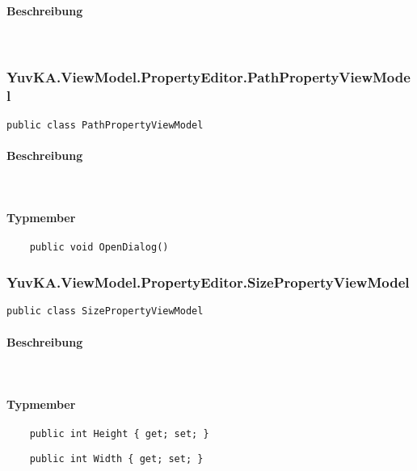 \paragraph{Beschreibung}~\\




\subsubsection{YuvKA.ViewModel.PropertyEditor.PathPropertyViewModel}

\begin{verbatim}
public class PathPropertyViewModel
\end{verbatim}

\paragraph{Beschreibung}~\\
\paragraph{Typmember}
\begin{itemize}

	\begin{verbatim}
	public void OpenDialog()
	\end{verbatim}

\end{itemize}




\subsubsection{YuvKA.ViewModel.PropertyEditor.SizePropertyViewModel}

\begin{verbatim}
public class SizePropertyViewModel
\end{verbatim}

\paragraph{Beschreibung}~\\
\paragraph{Typmember}
\begin{itemize}
	
	\begin{verbatim}
	public int Height { get; set; }
	\end{verbatim}

	\begin{verbatim}
	public int Width { get; set; }
	\end{verbatim}

\end{itemize}





